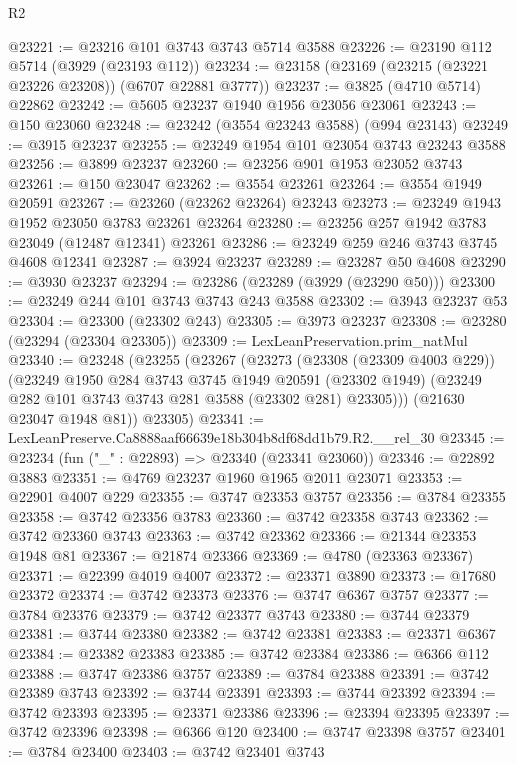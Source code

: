 \begin{lexlean}{R2}
\begin{coremodule}
@23221 := @23216 @101 @3743 @3743 @5714 @3588
@23226 := @23190 @112 @5714 (@3929 (@23193 @112))
@23234 := @23158 (@23169 (@23215 (@23221 @23226 @23208)) (@6707 @22881 @3777))
@23237 := @3825 (@4710 @5714) @22862
@23242 := @5605 @23237 @1940 @1956 @23056 @23061
@23243 := @150 @23060
@23248 := @23242 (@3554 @23243 @3588) (@994 @23143)
@23249 := @3915 @23237
@23255 := @23249 @1954 @101 @23054 @3743 @23243 @3588
@23256 := @3899 @23237
@23260 := @23256 @901 @1953 @23052 @3743
@23261 := @150 @23047
@23262 := @3554 @23261
@23264 := @3554 @1949 @20591
@23267 := @23260 (@23262 @23264) @23243
@23273 := @23249 @1943 @1952 @23050 @3783 @23261 @23264
@23280 := @23256 @257 @1942 @3783 @23049 (@12487 @12341) @23261
@23286 := @23249 @259 @246 @3743 @3745 @4608 @12341
@23287 := @3924 @23237
@23289 := @23287 @50 @4608
@23290 := @3930 @23237
@23294 := @23286 (@23289 (@3929 (@23290 @50)))
@23300 := @23249 @244 @101 @3743 @3743 @243 @3588
@23302 := @3943 @23237 @53
@23304 := @23300 (@23302 @243)
@23305 := @3973 @23237
@23308 := @23280 (@23294 (@23304 @23305))
@23309 := LexLeanPreservation.prim_natMul
@23340 := @23248
    (@23255
      (@23267
        (@23273
          (@23308 (@23309 @4003 @229))
          (@23249
            @1950
            @284
            @3743
            @3745
            @1949
            @20591
            (@23302 @1949)
            (@23249 @282 @101 @3743 @3743 @281 @3588 (@23302 @281) @23305)))
        (@21630 @23047 @1948 @81))
      @23305)
@23341 := LexLeanPreserve.Ca8888aaf66639e18b304b8df68dd1b79.R2.__rel_30
@23345 := @23234 (fun ("_" : @22893) => @23340 (@23341 @23060))
@23346 := @22892 @3883
@23351 := @4769 @23237 @1960 @1965 @2011 @23071
@23353 := @22901 @4007 @229
@23355 := @3747 @23353 @3757
@23356 := @3784 @23355
@23358 := @3742 @23356 @3783
@23360 := @3742 @23358 @3743
@23362 := @3742 @23360 @3743
@23363 := @3742 @23362
@23366 := @21344 @23353 @1948 @81
@23367 := @21874 @23366
@23369 := @4780 (@23363 @23367)
@23371 := @22399 @4019 @4007
@23372 := @23371 @3890
@23373 := @17680 @23372
@23374 := @3742 @23373
@23376 := @3747 @6367 @3757
@23377 := @3784 @23376
@23379 := @3742 @23377 @3743
@23380 := @3744 @23379
@23381 := @3744 @23380
@23382 := @3742 @23381
@23383 := @23371 @6367
@23384 := @23382 @23383
@23385 := @3742 @23384
@23386 := @6366 @112
@23388 := @3747 @23386 @3757
@23389 := @3784 @23388
@23391 := @3742 @23389 @3743
@23392 := @3744 @23391
@23393 := @3744 @23392
@23394 := @3742 @23393
@23395 := @23371 @23386
@23396 := @23394 @23395
@23397 := @3742 @23396
@23398 := @6366 @120
@23400 := @3747 @23398 @3757
@23401 := @3784 @23400
@23403 := @3742 @23401 @3743

\end{coremodule}
\end{lexlean}
